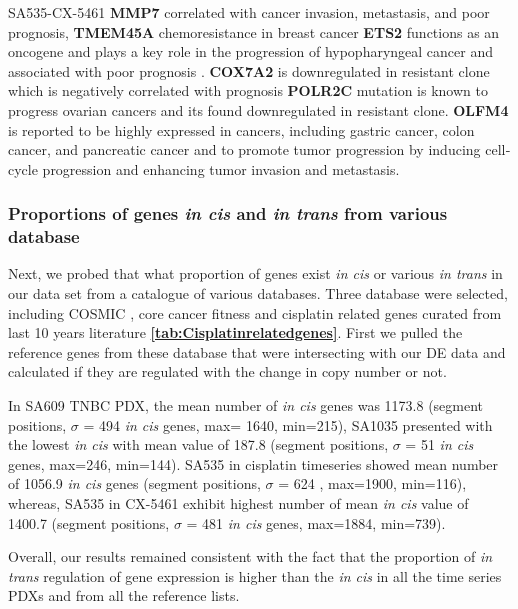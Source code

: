 SA535-CX-5461
\textbf{MMP7} \cite{mcgowan2008matrix} correlated with cancer invasion, metastasis, and poor prognosis,
\textbf{TMEM45A} \cite{schmit2019characterization} chemoresistance in breast cancer
\textbf{ETS2} \cite{ge2008role} functions as an oncogene and plays a key role in the progression of hypopharyngeal cancer and associated with poor prognosis \cite{fu2017high}.
\textbf{COX7A2} \cite{deng2018overexpression} is downregulated in resistant clone which is negatively correlated with prognosis
\textbf{POLR2C} \cite {moriwaki2017polr2c} mutation is known to progress ovarian cancers and its found downregulated in resistant clone.
\textbf{OLFM4} \cite{ashizawa2019olfm4} is reported to be highly expressed in cancers, including gastric cancer, colon cancer, and pancreatic cancer and to promote tumor progression by inducing cell‐cycle progression and enhancing tumor invasion and metastasis.





\subsubsection{Proportions of genes \textit{in cis} and \textit{in trans} from various database}
Next, we probed that what proportion of genes exist \textit{in cis} or various \textit{in trans} in our data set from a catalogue of various databases.
Three database were selected, including COSMIC \cite{vogelstein2013cancer}, core cancer fitness \cite{behan2019prioritization} and cisplatin related genes curated from last 10 years literature \textbf{\autoref{tab:Cisplatinrelatedgenes}}.
First we pulled the reference genes from these database that were intersecting with our \ac{DE} data and calculated if they are regulated with the change in copy number or not.

 In  SA609 TNBC PDX, the mean number of \textit{in cis} genes was 1173.8 (segment positions, $\sigma$ = 494 \textit{in cis} genes, max= 1640, min=215), SA1035 presented with the lowest \textit{in cis} with
 mean value of 187.8 (segment positions, $\sigma$ = 51 \textit{in cis} genes, max=246, min=144). SA535 in cisplatin timeseries showed mean number of 1056.9 \textit{in cis} genes (segment positions, $\sigma$ = 624 , max=1900, min=116), whereas, SA535 in CX-5461 exhibit highest number of mean \textit{in cis} value of 1400.7 (segment positions, $\sigma$ = 481 \textit{in cis} genes, max=1884, min=739).
 
 Overall, our results remained consistent with the fact that the proportion of \textit{in trans} regulation of gene expression is higher than the \textit{in cis} in all the time series PDXs and from all the reference lists.   
 
